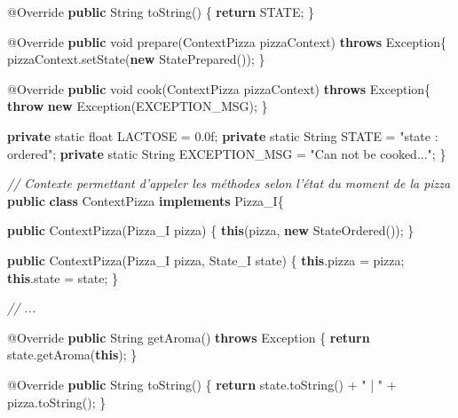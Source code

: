 \documentclass[french,]{article}
\newenvironment{Shaded}{}{}
\newcommand{\KeywordTok}[1]{\textcolor[rgb]{0.00,0.44,0.13}{\textbf{{#1}}}}
\newcommand{\DataTypeTok}[1]{\textcolor[rgb]{0.56,0.13,0.00}{{#1}}}
\newcommand{\FloatTok}[1]{\textcolor[rgb]{0.25,0.63,0.44}{{#1}}}
\newcommand{\StringTok}[1]{\textcolor[rgb]{0.25,0.44,0.63}{{#1}}}
\newcommand{\CommentTok}[1]{\textcolor[rgb]{0.38,0.63,0.69}{\textit{{#1}}}}
\newcommand{\FunctionTok}[1]{\textcolor[rgb]{0.02,0.16,0.49}{{#1}}}
\newcommand{\NormalTok}[1]{{#1}}
\begin{document}
\begin{Shaded}
\begin{Highlighting}[]
    \FunctionTok{@Override}
    \KeywordTok{public} \NormalTok{String }\FunctionTok{toString}\NormalTok{()}
    \NormalTok{\{}
        \KeywordTok{return} \NormalTok{STATE;}
    \NormalTok{\}}

    \FunctionTok{@Override}
    \KeywordTok{public} \DataTypeTok{void} \FunctionTok{prepare}\NormalTok{(ContextPizza pizzaContext) }\KeywordTok{throws} \NormalTok{Exception\{}
        \NormalTok{pizzaContext.}\FunctionTok{setState}\NormalTok{(}\KeywordTok{new} \FunctionTok{StatePrepared}\NormalTok{());}
    \NormalTok{\}}

    \FunctionTok{@Override}
    \KeywordTok{public} \DataTypeTok{void} \FunctionTok{cook}\NormalTok{(ContextPizza pizzaContext) }\KeywordTok{throws} \NormalTok{Exception\{}
        \KeywordTok{throw} \KeywordTok{new} \NormalTok{Exception(EXCEPTION_MSG);}
    \NormalTok{\}}

    \KeywordTok{private} \DataTypeTok{static} \DataTypeTok{float} \NormalTok{LACTOSE = }\FloatTok{0.}\NormalTok{0f;}
    \KeywordTok{private} \DataTypeTok{static} \NormalTok{String STATE = }\StringTok{"state : ordered"}\NormalTok{;}
    \KeywordTok{private} \DataTypeTok{static} \NormalTok{String EXCEPTION_MSG = }\StringTok{"Can not be cooked..."}\NormalTok{;}
\NormalTok{\}}

\CommentTok{// Contexte permettant d'appeler les méthodes selon l'état du moment de la pizza}
\KeywordTok{public} \KeywordTok{class} \NormalTok{ContextPizza }\KeywordTok{implements} \NormalTok{Pizza_I\{}

    \KeywordTok{public} \FunctionTok{ContextPizza}\NormalTok{(Pizza_I pizza) \{}
        \KeywordTok{this}\NormalTok{(pizza, }\KeywordTok{new} \FunctionTok{StateOrdered}\NormalTok{());}
    \NormalTok{\}}

    \KeywordTok{public} \FunctionTok{ContextPizza}\NormalTok{(Pizza_I pizza, State_I state) \{}
        \KeywordTok{this}\NormalTok{.}\FunctionTok{pizza} \NormalTok{= pizza;}
        \KeywordTok{this}\NormalTok{.}\FunctionTok{state} \NormalTok{= state;}
    \NormalTok{\}}

   \CommentTok{// ...}

    \FunctionTok{@Override}
    \KeywordTok{public} \NormalTok{String }\FunctionTok{getAroma}\NormalTok{() }\KeywordTok{throws} \NormalTok{Exception \{}
        \KeywordTok{return} \NormalTok{state.}\FunctionTok{getAroma}\NormalTok{(}\KeywordTok{this}\NormalTok{);}
    \NormalTok{\}}

    \FunctionTok{@Override}
    \KeywordTok{public} \NormalTok{String }\FunctionTok{toString}\NormalTok{() \{}
        \KeywordTok{return} \NormalTok{state.}\FunctionTok{toString}\NormalTok{() + }\StringTok{" | "} \NormalTok{+ pizza.}\FunctionTok{toString}\NormalTok{();}
    \NormalTok{\}}


\end{Highlighting}
\end{Shaded}
\end{document}
